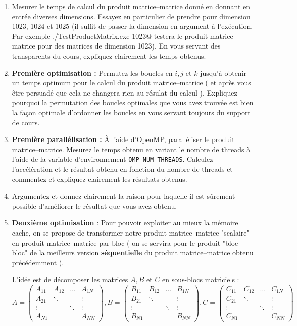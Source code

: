 \documentclass[11pt,a4paper]{article}
\begin{document}
\begin{enumerate}
	\item Mesurer le temps de calcul du produit matrice--matrice donné en donnant en entrée diverses dimensions. Essayez en particulier de prendre pour dimension 1023, 1024 et 1025 (il suffit de passer la dimension en argument à l'exécution. Par exemple \verb@./TestProductMatrix.exe 1023@ testera le produit matrice-matrice pour des matrices de dimension 1023). En vous servant 
	des transparents du cours, expliquez clairement les temps obtenus.
	\item \textbf{\color{blue}Première optimisation :} Permutez les  boucles en $i,j$ et $k$ jusqu'à obtenir un temps optimum pour le calcul du produit matrice--matrice ( et après vous être persuadé que cela ne changera rien au résulat du calcul ). Expliquez pourquoi la permutation des boucles optimales que vous avez trouvée
	est bien la façon optimale d'ordonner les boucles en vous servant toujours du support de cours.
	\item \textbf{\color{blue}Première parallélisation : } \`A l'aide d'OpenMP, paralléliser le produit matrice--matrice. Mesurez le temps obtenu en variant le nombre de threads à l'aide de la variable d'environnement \texttt{OMP\_NUM\_THREADS}. Calculez l'accélération et le résultat obtenu en fonction du nombre de threads et commentez et expliquez clairement les résultats obtenus. 
	\item Argumentez et donnez clairement la raison pour laquelle il est sûrement possible d'améliorer le résultat que vous avez obtenu.
	\item \textbf{\color{blue}Deuxième optimisation }: 
	Pour pouvoir exploiter au mieux la mémoire cache, on se propose de transformer notre produit matrice--matrice "scalaire" en produit matrice--matrice par bloc ( on se servira pour le produit "bloc--bloc" de la meilleurs version \textbf{séquentielle} du produit matrice--matrice obtenu précédemment ).

	L'idée est de décomposer les matrices $A,B$ et $C$ en sous-blocs matriciels :
	\[
	A = \left(
	\begin{array}{cccc}
	A_{11} & A_{12} & \ldots & A_{1N} \\
	A_{21} & \ddots &        & \vdots \\
	\vdots &        & \ddots & \vdots \\
	A_{N1} &        &        & A_{NN}
	\end{array}
	\right),
	B = \left(
	\begin{array}{cccc}
	B_{11} & B_{12} & \ldots & B_{1N} \\
	B_{21} & \ddots &        & \vdots \\
	\vdots &        & \ddots & \vdots \\
	B_{N1} &        &        & B_{NN}
	\end{array}
	\right),
	C = \left(
	\begin{array}{cccc}
	C_{11} & C_{12} & \ldots & C_{1N} \\
	C_{21} & \ddots &        & \vdots \\
	\vdots &        & \ddots & \vdots \\
	C_{N1} &        &        & C_{NN}
	\end{array}
	\right)
	\]


\end{enumerate}
\end{document}

